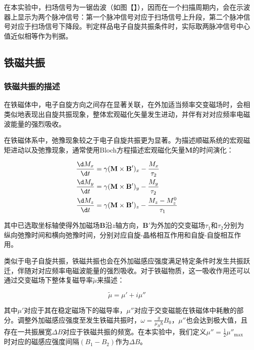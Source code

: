 \documentclass{thuemp}
\begin{document}
在本实验中，扫场信号为一锯齿波（如图【】），因而在一个扫描周期内，会在示波器上显示为两个脉冲信号：第一个脉冲信号对应于扫场信号上升段，第二个脉冲信号对应于扫场信号下降段。判定样品电子自旋共振条件时，实际取两脉冲信号中心值近似相等作为判据。

\subsection{铁磁共振}

\subsubsection{铁磁共振的描述}

在铁磁体中，电子自旋方向之间存在显著关联，在外加适当频率交变磁场时，会相类似地表现出自旋共振现象，整体宏观磁化矢量发生进动，并伴有对对应频率电磁波能量的强烈吸收。

在铁磁体系中，弛豫现象较之于电子自旋共振更为显著。为描述顺磁系统的宏观磁矩进动以及弛豫现象，通常使用Bloch方程描述宏观磁化矢量$\mathbf{M}$的时间演化：

\begin{equation}
\begin{aligned}
    \frac{\d M_x}{\d t} &= \gamma (\mathbf{M} \times \mathbf{B'})_x - \frac{M_x}{\tau_2} \\
    \frac{\d M_y}{\d t} &= \gamma (\mathbf{M} \times \mathbf{B'})_y - \frac{M_y}{\tau_2} \\
    \frac{\d M_z}{\d t} &= \gamma (\mathbf{M} \times \mathbf{B'})_z - \frac{M_z - M_z^0}{\tau_1}
\end{aligned}
\end{equation}

其中已选取坐标轴使得外加磁场$\mathbf{B}$沿$z$轴方向，$\mathbf{B'}$为外加的交变磁场$\tau_1$和$\tau_2$分别为纵向弛豫时间和横向弛豫时间，分别对应自旋-晶格相互作用和自旋-自旋相互作用。

类似于电子自旋共振，铁磁共振也会在外加磁感应强度满足特定条件时发生共振跃迁，伴随对对应频率电磁波能量的强烈吸收。对于铁磁物质，这一吸收作用还可以通过交变磁场下整体复磁导率$\tilde\mu $来描述：

\begin{equation}
    \tilde\mu = \mu' + i\mu''
\end{equation}

其中$\mu'$对应于其在稳定磁场下的磁导率，$\mu''$对应于交变磁能在铁磁体中耗散的部分。调整外加磁感应强度至发生铁磁共振时，$\omega = \frac{g}{\mu_B\hbar} B_0$，$\mu''$也会达到极大值，且存在一共振展宽$\Delta B$对应于铁磁共振的频宽。在本实验中，我们定义$\mu'' = \frac 1 2 \mu''_{\mathrm{max}}$时对应的磁感应强度间隔$(B_1 - B_2)$作为$\Delta B$。
\end{document}
